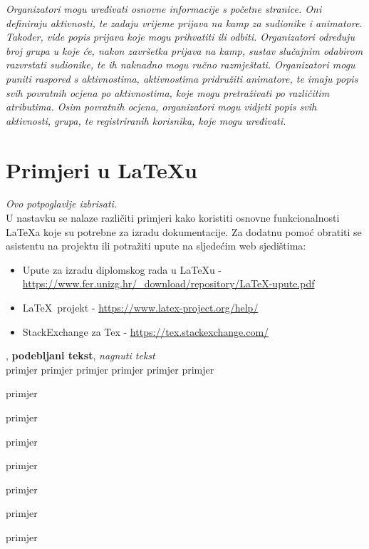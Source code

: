 		\textit{Organizatori mogu uređivati osnovne informacije s početne stranice. Oni definiraju aktivnosti, te zadaju vrijeme prijava na kamp za sudionike i animatore. Također, vide popis prijava koje mogu prihvatiti ili odbiti. Organizatori određuju broj grupa u koje će, nakon završetka prijava na kamp, sustav slučajnim odabirom razvrstati sudionike, te ih naknadno mogu ručno razmještati. Organizatori mogu puniti raspored s aktivnostima, aktivnostima pridružiti animatore, te imaju popis svih povratnih ocjena po aktivnostima, koje mogu pretraživati po različitim atributima. Osim povratnih ocjena, organizatori mogu vidjeti popis svih aktivnosti, grupa, te registriranih korisnika, koje mogu uređivati. } 
		
		
		\eject
		
		\section{Primjeri u \LaTeX u}
		
		\textit{Ovo potpoglavlje izbrisati.}\\

		U nastavku se nalaze različiti primjeri kako koristiti osnovne funkcionalnosti \LaTeX a koje su potrebne za izradu dokumentacije. Za dodatnu pomoć obratiti se asistentu na projektu ili potražiti upute na sljedećim web sjedištima:
		\begin{itemize}
			\item Upute za izradu diplomskog rada u \LaTeX u - \url{https://www.fer.unizg.hr/_download/repository/LaTeX-upute.pdf}
			\item \LaTeX\ projekt - \url{https://www.latex-project.org/help/}
			\item StackExchange za Tex - \url{https://tex.stackexchange.com/}\\
		
		\end{itemize} 	


		
		\noindent {}, \textbf{podebljani tekst}, 	\textit{nagnuti tekst}\\
		\noindent \normalsize primjer \large primjer \Large primjer \LARGE {primjer} \huge {primjer} \Huge primjer \normalsize
				
		\begin{packed_item}
			
			\item  primjer
			\item  primjer
			\item  primjer
			\item[] \begin{packed_enum}
				\item primjer
				\item[] \begin{packed_enum}
					\item[1.a] primjer
					\item[b] primjer
				\end{packed_enum}
				\item primjer
			\end{packed_enum}
			
		\end{packed_item}
		
